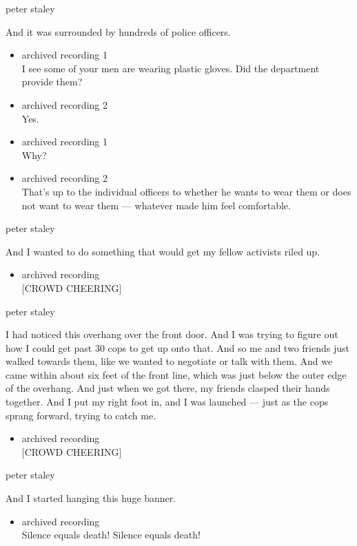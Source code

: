 peter staley

And it was surrounded by hundreds of police officers.

\begin{itemize}
\item
  archived recording 1\\
  I see some of your men are wearing plastic gloves. Did the department
  provide them?
\item
  archived recording 2\\
  Yes.
\item
  archived recording 1\\
  Why?
\item
  archived recording 2\\
  That's up to the individual officers to whether he wants to wear them
  or does not want to wear them --- whatever made him feel comfortable.
\end{itemize}

peter staley

And I wanted to do something that would get my fellow activists riled
up.

\begin{itemize}
\tightlist
\item
  archived recording\\
  {[}CROWD CHEERING{]}
\end{itemize}

peter staley

I had noticed this overhang over the front door. And I was trying to
figure out how I could get past 30 cops to get up onto that. And so me
and two friends just walked towards them, like we wanted to negotiate or
talk with them. And we came within about six feet of the front line,
which was just below the outer edge of the overhang. And just when we
got there, my friends clasped their hands together. And I put my right
foot in, and I was launched --- just as the cops sprang forward, trying
to catch me.

\begin{itemize}
\tightlist
\item
  archived recording\\
  {[}CROWD CHEERING{]}
\end{itemize}

peter staley

And I started hanging this huge banner.

\begin{itemize}
\tightlist
\item
  archived recording\\
  Silence equals death! Silence equals death!
\end{itemize}


